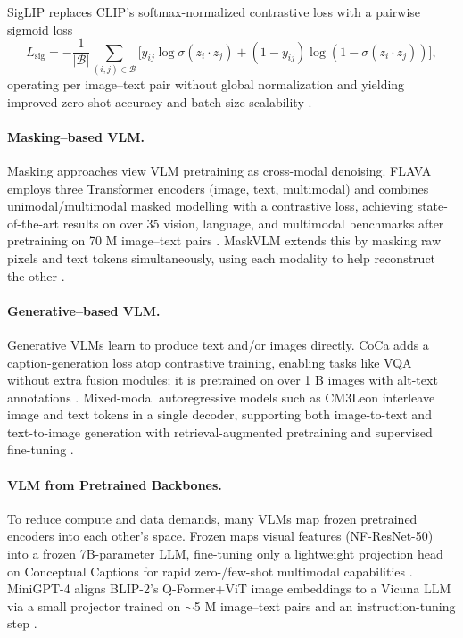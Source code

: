 SigLIP replaces \ac{CLIP}'s softmax-normalized contrastive loss with a pairwise sigmoid loss 
\begin{equation*}
    L_{\mathrm{sig}} = -\dfrac{1}{|\mathcal B|}\sum_{(i,j)\in\mathcal B}\bigl[y_{ij}\log\sigma(z_i\!\cdot\!z_j)+(1-y_{ij})\log(1-\sigma(z_i\!\cdot\!z_j))\bigr],
\end{equation*}
operating per image–text pair without global normalization and yielding improved zero-shot accuracy and batch-size scalability \cite{SIGLIP2023}.

\paragraph{Masking–based VLM.}
Masking approaches view \ac{VLM} pretraining as cross-modal denoising. FLAVA employs three Transformer encoders (image, text, multimodal) and combines unimodal/multimodal masked modelling with a contrastive loss, achieving state-of-the-art results on over 35 vision, language, and multimodal benchmarks after pretraining on 70 M image–text pairs \cite{FLAVA2022}. MaskVLM extends this by masking raw pixels and text tokens simultaneously, using each modality to help reconstruct the other \cite{MASKEDVLM2023}.

\paragraph{Generative–based VLM.}
Generative \acp{VLM} learn to produce text and/or images directly. CoCa adds a caption-generation loss atop contrastive training, enabling tasks like \ac{VQA} without extra fusion modules; it is pretrained on over 1 B images with alt-text annotations \cite{COCA2022}. Mixed-modal autoregressive models such as CM3Leon interleave image and text tokens in a single decoder, supporting both image-to-text and text-to-image generation with retrieval-augmented pretraining and supervised fine-tuning \cite{CM3LEON2023}.

\paragraph{VLM from Pretrained Backbones.}
To reduce compute and data demands, many \acp{VLM} map frozen pretrained encoders into each other's space. Frozen maps visual features (NF-ResNet-50) into a frozen 7B-parameter \ac{LLM}, fine-tuning only a lightweight projection head on Conceptual Captions for rapid zero-/few-shot multimodal capabilities \cite{FROZENLANGUAGE2021}. Mini\ac{GPT}-4 aligns BLIP-2's Q-Former+\ac{ViT} image embeddings to a Vicuna \ac{LLM} via a small projector trained on $\sim$5 M image–text pairs and an instruction-tuning step \cite{MINIGPT42023}.

